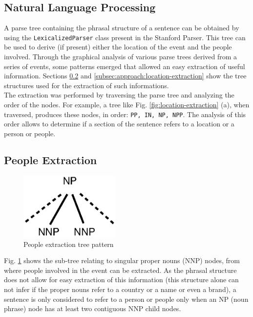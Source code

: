 \documentclass{llncs}
\begin{document}
\subsection{Natural Language Processing}
\label{subsec:approach:nlp}

A parse tree containing the phrasal structure of a sentence can be obtained by using the \verb!LexicalizedParser! class present in the Stanford Parser. This tree can be used to derive (if present) either the location of the event and the people involved. Through the graphical analysis of various parse trees derived from a series of events, some patterns emerged that allowed an easy extraction of useful information. Sections \ref{subsec:approach:people-extraction} and \ref{subsec:approach:location-extraction} show the tree structures used for the extraction of such informations.\cite{santorini}\cite{bies}\\

The extraction was performed by traversing the parse tree and analyzing the order of the nodes. For example, a tree like Fig. \ref{fig:location-extraction} (a), when traversed, produces these nodes, in order: \verb!PP, IN, NP, NPP!. The analysis of this order allows to determine if a section of the sentence refers to a location or a person or people.

\subsection{People Extraction}
\label{subsec:approach:people-extraction}

\begin{figure}[h!]
	\centering
	\includegraphics[width=50mm]{dia/people.eps}
	\caption{People extraction tree pattern}
	\label{fig:people-extraction}
\end{figure}

Fig. \ref{fig:people-extraction} shows the sub-tree relating to singular proper nouns (NNP) nodes, from where people involved in the event can be extracted. As the phrasal structure does not allow for easy extraction of this information (this structure alone can not infer if the proper nouns refer to a country or a name or even a brand), a sentence is only considered to refer to a person or people only when an NP (noun phrase) node has at least two contiguous NNP child nodes.
\end{document}
